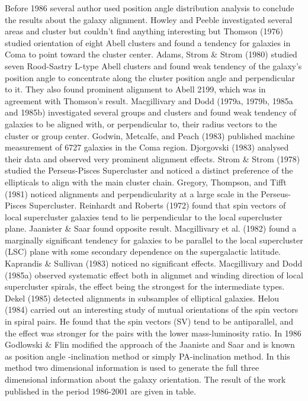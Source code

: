 Before 1986 several author used position angle distribution analysis to conclude the results about the galaxy alignment. Howley and Peeble investigated several areas and cluster but couldn't find anything interesting but Thomson (1976) studied  orientation of eight Abell clusters and found a tendency for galaxies in Coma to point toward the cluster center. Adams, Strom \& Strom (1980) studied seven Rood-Sastry L-type Abell clusters and found weak tendency of the galaxy's position angle to concentrate along the cluster position angle and perpendicular to it. They also found prominent alignment to Abell 2199, which was in agreement with Thomson's result. Macgillivary and Dodd (1979a, 1979b, 1985a and 1985b) investigated several groups and clusters and found weak tendency of galaxies to be aligned with, or perpendicular to, their radius vectors to the cluster or group center. Godwin, Metcalfe, and Peach (1983) published machine measurement of 6727 galaxies in the Coma region. Djorgovski (1983) analysed their data and observed very prominent alignment effects. Strom \& Strom (1978) studied the Perseus-Pisces Supercluster and noticed a distinct preference of the ellipticals to align with the main cluster chain. Gregory, Thompson, and Tifft (1981) noticed alignments and perpendicularity at a large scale in the Perseus-Pisces Supercluster. Reinhardt and Roberts (1972) found that spin vectors of local supercluster galaxies tend to lie perpendicular to the local supercluster plane. Jaanister \& Saar found opposite result. Macgillivary et al. (1982) found a marginally significant tendency for galaxies to be parallel to the local supercluster (LSC) plane with some secondary dependence on the supergalactic latitude. Kaprandis \& Sullivan (1983) noticed no significant effects. Macgillivary and Dodd (1985a) observed systematic effect both in alignmet and winding direction of local supercluster spirals, the effect being the strongest for the intermediate types. Dekel (1985) detected alignments in subsamples of elliptical galaxies. Helou (1984) carried out an interesting study of mutual orientations of the spin vectors in spiral pairs. He found that the spin vectors (SV) tend to be antiparallel, and the effect was stronger for the pairs with the lower mass-luminosity ratio.
In 1986 Godlowski \& Flin modified the approach of the Jaaniste and Saar and is known as position angle -inclination method or simply PA-inclination method. In this method two dimensional information is used to generate the full three dimensional information about the galaxy orientation. The result of the work published in the period 1986-2001 are given in table. \\\\%

